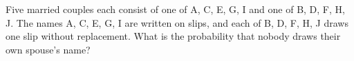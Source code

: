 Five married couples each consist of one of A, C, E, G, I and one of B, D, F, H, J. The names A, C, E, G, I are written on slips, and each of B, D, F, H, J draws one slip without replacement. What is the probability that nobody draws their own spouse's name?
